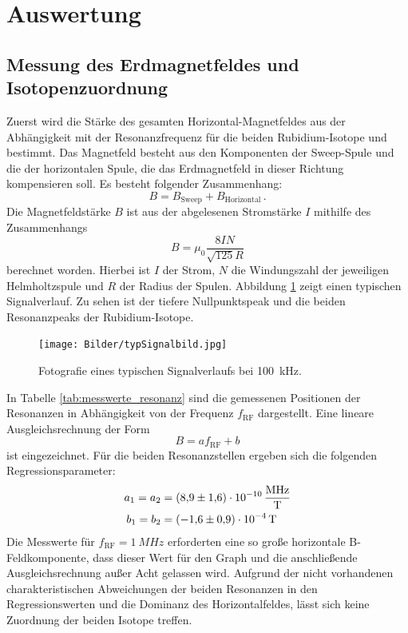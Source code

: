 \section{Auswertung}
\subsection{Messung des Erdmagnetfeldes und Isotopenzuordnung}
Zuerst wird die Stärke des gesamten Horizontal-Magnetfeldes aus der Abhängigkeit mit der Resonanzfrequenz für die beiden Rubidium-Isotope  und  bestimmt.
Das Magnetfeld besteht aus den Komponenten der Sweep-Spule und die der horizontalen Spule, die das Erdmagnetfeld in dieser Richtung kompensieren soll. Es besteht folgender Zusammenhang:
\begin{equation}
  B=B_\text{Sweep}+B_\text{Horizontal}\,.
\end{equation}
Die Magnetfeldstärke $B$ ist aus der abgelesenen Stromstärke $I$ mithilfe des Zusammenhangs
\begin{equation}
B=\mu_0\frac{8IN}{\sqrt{125}R}
\end{equation}
berechnet worden. Hierbei ist $I$ der Strom, $N$ die Windungszahl der jeweiligen Helmholtzspule und $R$ der Radius der Spulen.
Abbildung \ref{fig:typSignalbild} zeigt einen typischen Signalverlauf. Zu sehen ist der tiefere Nullpunktspeak und die beiden Resonanzpeaks der Rubidium-Isotope.
\begin{figure}[H]
  \centering
  \texttt{[image: Bilder/typSignalbild.jpg]}
  \caption{Fotografie eines typischen Signalverlaufs bei \SI{100}{kHz}.}
  \label{fig:typSignalbild}
\end{figure}
In Tabelle \ref{tab:messwerte_resonanz} sind die gemessenen Positionen der Resonanzen in Abhängigkeit von der Frequenz $f_\text{RF}$ dargestellt. Eine lineare Ausgleichsrechnung der Form
\begin{equation}
  B=af_\text{RF}+b
\end{equation}
ist eingezeichnet.
Für die beiden Resonanzstellen ergeben sich die folgenden Regressionsparameter:
\begin{align*}
  a_1 = a_2 &= \SI{8,9 \pm 1,6 e-10}{\frac{MHz}{T}} \\
  b_1 = b_2 &= \SI{-1,6 \pm 0,9 e-4}{T}\\
\end{align*}
Die Messwerte für $f_\text{RF}=\SI{1}{MHz}$ erforderten eine so große horizontale B-Feldkomponente, dass dieser Wert für den Graph und die anschließende Ausgleichsrechnung außer Acht gelassen wird. Aufgrund der nicht vorhandenen charakteristischen Abweichungen der beiden Resonanzen in den Regressionswerten und die Dominanz des Horizontalfeldes, lässt sich keine Zuordnung der beiden Isotope treffen.
